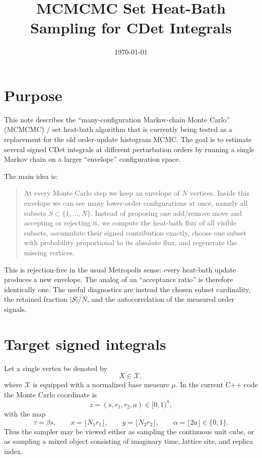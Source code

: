 \documentclass[11pt]{article}
\title{MCMCMC Set Heat-Bath Sampling for CDet Integrals}
\author{}
\date{\today}
\newcommand{\1}{\mathbf{1}}
\newcommand{\calX}{\mathcal{X}}
\newcommand{\card}[1]{\left|#1\right|}
\begin{document}
\maketitle

\tableofcontents

\section{Purpose}

This note describes the ``many-configuration Markov-chain Monte Carlo''
(MCMCMC) / set heat-bath algorithm that is currently being tested as a
replacement for the old order-update histogram MCMC.  The goal is to estimate
several signed CDet integrals at different perturbation orders by running a
single Markov chain on a larger ``envelope'' configuration space.

The main idea is:
\begin{quote}
At every Monte Carlo step we keep an envelope of \(N\) vertices.  Inside this
envelope we can see many lower-order configurations at once, namely all
subsets \(S\subset\{1,\ldots,N\}\).  Instead of proposing one add/remove move
and accepting or rejecting it, we compute the heat-bath flux of all visible
subsets, accumulate their signed contribution exactly, choose one subset with
probability proportional to its absolute flux, and regenerate the missing
vertices.
\end{quote}

This is rejection-free in the usual Metropolis sense: every heat-bath update
produces a new envelope.  The analog of an ``acceptance ratio'' is therefore
identically one.  The useful diagnostics are instead the chosen subset
cardinality, the retained fraction \(\card{S}/N\), and the autocorrelation of
the measured order signals.

\section{Target signed integrals}

Let a single vertex be denoted by
\[
  X\in\calX,
\]
where \(\calX\) is equipped with a normalized base measure \(\mu\).  In the
current C++ code the Monte Carlo coordinate is
\[
  z=(s,r_1,r_2,a)\in [0,1)^4,
\]
with the map
\[
  \tau=\beta s,\qquad
  x=\lfloor N_1 r_1\rfloor,\qquad
  y=\lfloor N_2 r_2\rfloor,\qquad
  \alpha=\lfloor 2a\rfloor \in\{0,1\}.
\]
Thus the sampler may be viewed either as sampling the continuous unit cube, or
as sampling a mixed object consisting of imaginary time, lattice site, and
replica index.
\end{document}
